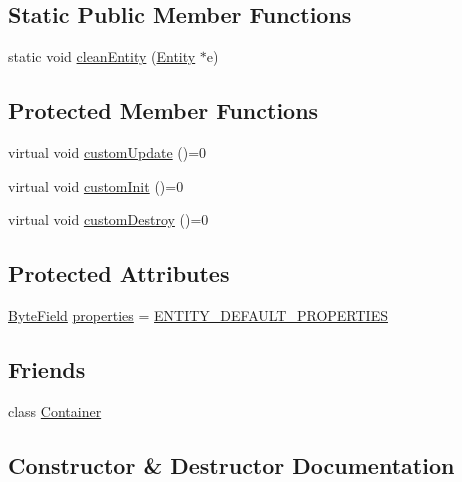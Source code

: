 \subsection*{Static Public Member Functions}
\begin{DoxyCompactItemize}
\item 
static void \hyperlink{classmc_1_1_entity_a1db8a8b8c969deedaf12f8892531d8d0}{clean\+Entity} (\hyperlink{classmc_1_1_entity}{Entity} $\ast$e)
\end{DoxyCompactItemize}
\subsection*{Protected Member Functions}
\begin{DoxyCompactItemize}
\item 
virtual void \hyperlink{classmc_1_1_entity_af10b82880e3740b7cbb5ed80bb9f6004}{custom\+Update} ()=0
\item 
virtual void \hyperlink{classmc_1_1_entity_a6f8fcf75f3b584fc47523110a1c74f39}{custom\+Init} ()=0
\item 
virtual void \hyperlink{classmc_1_1_entity_a2f639d91d2f9e933f4769841ad348ddd}{custom\+Destroy} ()=0
\end{DoxyCompactItemize}
\subsection*{Protected Attributes}
\begin{DoxyCompactItemize}
\item 
\hyperlink{namespacemc_a4ed352b00f84d2c3e9843cf5ea375ca0}{Byte\+Field} \hyperlink{classmc_1_1_entity_a4b96da9b66787566c63044472d690da1}{properties} = \hyperlink{namespacemc_aad93bda8c11c45721d4d2feb348f9d5f}{E\+N\+T\+I\+T\+Y\+\_\+\+D\+E\+F\+A\+U\+L\+T\+\_\+\+P\+R\+O\+P\+E\+R\+T\+I\+ES}
\end{DoxyCompactItemize}
\subsection*{Friends}
\begin{DoxyCompactItemize}
\item 
class \hyperlink{classmc_1_1_entity_aee29d97f7e87f0263024133085c28e3d}{Container}
\end{DoxyCompactItemize}


\subsection{Constructor \& Destructor Documentation}
